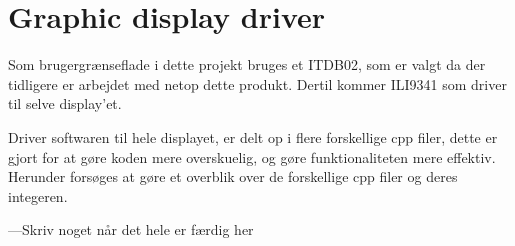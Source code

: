 \graphicspath{{Chapters/Struktur/}}

\section{Graphic display driver}

Som brugergrænseflade i dette projekt bruges et ITDB02, som er valgt da der tidligere er arbejdet med netop dette produkt. Dertil kommer ILI9341 som driver til selve display'et. 

Driver softwaren til hele displayet, er delt op i flere forskellige cpp filer, dette er gjort for at gøre koden mere overskuelig, og gøre funktionaliteten mere effektiv. Herunder forsøges at gøre et overblik over de forskellige cpp filer og deres integeren. 


---Skriv noget når det hele er færdig her



